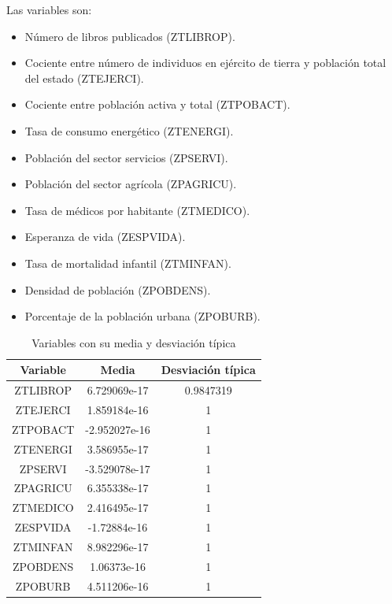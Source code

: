 \documentclass[twoside,openright,titlepage,numbers=noenddot,openany,headinclude,footinclude=true,
cleardoublepage=empty,abstractoff,BCOR=5mm,paper=a4,fontsize=12pt,main=spanish]{scrreprt}
\begin{document}
Las variables son:

\begin{itemize}
\item Número de libros publicados (ZTLIBROP).
\item Cociente entre número de individuos en ejército de tierra y población total del estado (ZTEJERCI).
\item Cociente entre población activa y total (ZTPOBACT).
\item Tasa de consumo energético (ZTENERGI).
\item Población del sector servicios (ZPSERVI).
\item Población del sector agrícola (ZPAGRICU).
\item Tasa de médicos por habitante (ZTMEDICO).
\item Esperanza de vida (ZESPVIDA).
\item Tasa de mortalidad infantil (ZTMINFAN).
\item Densidad de población (ZPOBDENS).
\item Porcentaje de la población urbana (ZPOBURB).
\end{itemize}

\begin{table}
\begin{center}
\begin{tabular}{ |c|c|c| } 
 \hline
 Variable & Media & Desviación típica \\
 \hline
 ZTLIBROP & 6.729069e-17 & 0.9847319 \\ 
 ZTEJERCI & 1.859184e-16 & 1 \\ 
 ZTPOBACT & -2.952027e-16 & 1 \\
 ZTENERGI & 3.586955e-17 & 1 \\
 ZPSERVI & -3.529078e-17 & 1 \\
 ZPAGRICU & 6.355338e-17 & 1 \\
 ZTMEDICO & 2.416495e-17 & 1 \\ 
 ZESPVIDA & -1.72884e-16 & 1 \\
 ZTMINFAN & 8.982296e-17 & 1 \\
 ZPOBDENS & 1.06373e-16 & 1 \\
 ZPOBURB & 4.511206e-16 & 1 \\
 \hline
\end{tabular}
\end{center}

\caption{Variables con su media y desviación típica}
\label{tab: metodos}
\end{table}
\end{document}
